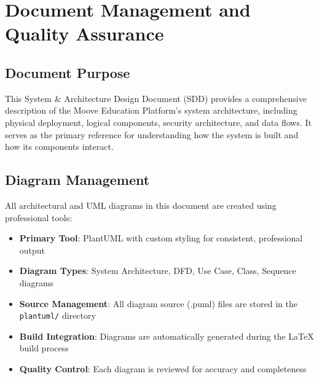 \def\docTitle{System \& Architecture Design Document (SDD)}
\def\docVersion{3.1}
\def\docDate{July 21, 2026}



\usepackage{longtable}
\usepackage{booktabs}
\usepackage{colortbl}



\sloppy



\tableofcontents
\newpage

\listoffigures
{}
\newpage

\listoftables
{}
\newpage

\section{Document Management and Quality Assurance}

\subsection{Document Purpose}
This System \& Architecture Design Document (SDD) provides a comprehensive description of the Moove Education Platform's system architecture, including physical deployment, logical components, security architecture, and data flows. It serves as the primary reference for understanding how the system is built and how its components interact.

\subsection{Diagram Management}
All architectural and UML diagrams in this document are created using professional tools:

\begin{itemize}
    \item \textbf{Primary Tool}: PlantUML with custom styling for consistent, professional output
    \item \textbf{Diagram Types}: System Architecture, DFD, Use Case, Class, Sequence diagrams
    \item \textbf{Source Management}: All diagram source (.puml) files are stored in the \texttt{plantuml/} directory
    \item \textbf{Build Integration}: Diagrams are automatically generated during the LaTeX build process
    \item \textbf{Quality Control}: Each diagram is reviewed for accuracy and completeness
\end{itemize}

